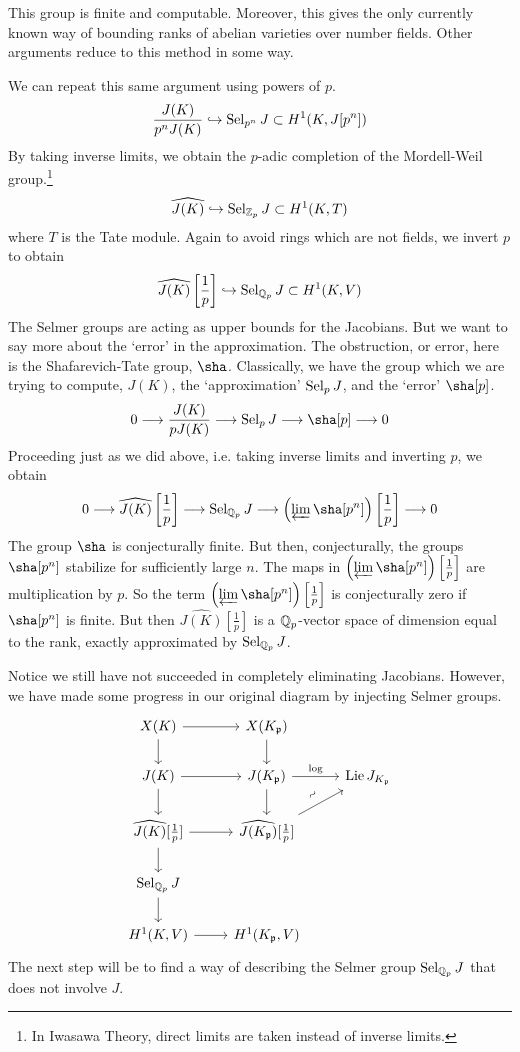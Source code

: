 \begin{rem}
This group is finite and computable. Moreover, this gives the only currently known way of bounding ranks of abelian varieties over number fields. Other arguments reduce to this method in some way. 
\end{rem}


We can repeat this same argument using powers of $p$.
	\[
	\dfrac{J(K)}{p^nJ(K)} \hookrightarrow \operatorname{Sel}_{p^n} J \subset H^1(K,J[p^n])
	\]
By taking inverse limits, we obtain the $p$-adic completion of the Mordell-Weil group.\footnote{In Iwasawa Theory, direct limits are taken instead of inverse limits.}
	\[
	\widehat{J(K)} \hookrightarrow \operatorname{Sel}_{\mathbb{Z}_p} J \subset H^1(K,T)
	\]
where $T$ is the Tate module. Again to avoid rings which are not fields, we invert $p$ to obtain
	\[
	\widehat{J(K)}\left[\frac{1}{p}\right] \hookrightarrow \operatorname{Sel}_{\mathbb{Q}_p} J \subset H^1(K,V)
	\]
The Selmer groups are acting as upper bounds for the Jacobians. But we want to say more about the `error' in the approximation. The obstruction, or error, here is the Shafarevich-Tate group, $\sha$. Classically, we have the group which we are trying to compute, $J(K)$, the `approximation' $\operatorname{Sel}_p J$, and the `error' $\sha[p]$.
	\[
	0 \ma{} \dfrac{J(K)}{pJ(K)} \ma{} \sel_p J \ma{} \sha[p] \ma{} 0
	\]
Proceeding just as we did above, i.e. taking inverse limits and inverting $p$, we obtain
	\[
	0 \ma{} \hat{J(K)}\left[\frac{1}{p}\right] \ma{} \sel_{\Qp} J \ma{} \left( \plim \sha[p^n] \right)\left[\frac{1}{p}\right] \ma{} 0
	\] 
The group $\sha$ is conjecturally finite. But then, conjecturally, the groups $\sha[p^n]$ stabilize for sufficiently large $n$. The maps in $\left( \plim \sha[p^n] \right)\left[\frac{1}{p}\right]$ are multiplication by $p$. So the term $\left( \plim \sha[p^n] \right)\left[\frac{1}{p}\right]$ is conjecturally zero if $\sha[p^n]$ is finite. But then $\hat{J(K)}\left[\frac{1}{p}\right]$ is a $\mathbb{Q}_p$-vector space of dimension equal to the rank, exactly approximated by $\operatorname{Sel}_{\mathbb{Q}_p} J$. 


Notice we still have not succeeded in completely eliminating Jacobians. However, we have made some progress in our original diagram by injecting Selmer groups. 
	\[
	\begin{tikzcd}
	X(K) \arrow{d} \arrow{r} & X(K_\p) \arrow{d} \\
	J(K) \arrow{r} \arrow{d} & J(K_\p) \arrow{r}{\log} \arrow{d} & \lie J_{K_\p} \\
	\widehat{J(K)}[\frac{1}{p}] \arrow{r} \arrow{d} & \widehat{J(K_\p)}[\frac{1}{p}] \arrow{ur}{\rotatebox{45}{$\sim$}} \\
	\sel_{\Qp} J \arrow{d} \\
	H^1(K,V) \arrow{r} & H^1(K_\p,V)
	\end{tikzcd}
	\]
The next step will be to find a way of describing the Selmer group $\operatorname{Sel}_{\mathbb{Q}_p} J$ that does not involve $J$.



